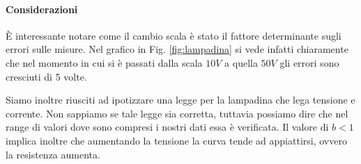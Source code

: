 \paragraph{Considerazioni\\}
È interessante notare come il cambio scala è stato il fattore determinante sugli errori sulle misure. Nel grafico in Fig. \ref{fig:lampadina} si vede infatti chiaramente che nel momento in cui si è passati dalla scala $10V$ a quella $50V$ gli errori sono cresciuti di 5 volte.
 
Siamo inoltre riusciti ad ipotizzare una legge per la lampadina che lega tensione e corrente. Non sappiamo se tale legge sia corretta, tuttavia possiamo dire che nel range di valori dove sono compresi i nostri dati essa è verificata. Il valore di $b<1$ implica inoltre che aumentando la tensione la curva tende ad appiattirsi, ovvero la resistenza aumenta. 